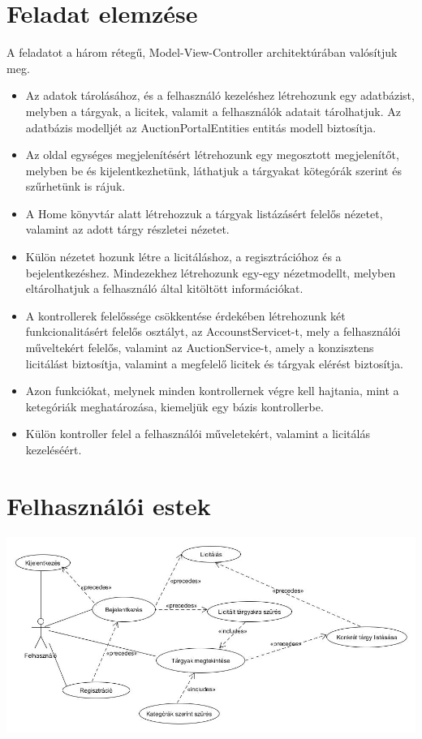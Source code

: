 \documentclass[12pt,a4paper]{article}
\begin{document}
\section{Feladat elemzése}
A feladatot a három rétegű, Model-View-Controller architektúrában valósítjuk meg.
\begin{itemize}
\item Az adatok tárolásához, és a felhasználó kezeléshez létrehozunk egy adatbázist, melyben a tárgyak, a licitek, valamit a felhasználók adatait tárolhatjuk. Az adatbázis modelljét az AuctionPortalEntities entitás modell biztosítja.
\item Az oldal egységes megjelenítésért létrehozunk egy megosztott megjelenítőt, melyben be és kijelentkezhetünk, láthatjuk a tárgyakat kötegórák szerint és szűrhetünk is rájuk.
\item A Home könyvtár alatt létrehozzuk a tárgyak listázásért felelős nézetet, valamint az adott tárgy részletei nézetet.
\item Külön nézetet hozunk létre a licitáláshoz, a regisztrációhoz és a bejelentkezéshez. Mindezekhez létrehozunk egy-egy nézetmodellt, melyben eltárolhatjuk a felhasználó által kitöltött információkat.
\item A kontrollerek felelőssége csökkentése érdekében létrehozunk két funkcionalitásért felelős osztályt, az AccounstServicet-t, mely a felhasználói műveltekért felelős, valamint az AuctionService-t, amely a konzisztens licitálást biztosítja, valamint a megfelelő licitek és tárgyak elérést biztosítja.
\item Azon funkciókat, melynek minden kontrollernek  végre kell hajtania, mint a ketegóriák meghatározása, kiemeljük egy bázis kontrollerbe.
\item Külön kontroller felel a felhasználói műveletekért, valamint a licitálás kezeléséért.
\end{itemize}

\section{Felhasználói estek}
\includegraphics[scale=0.5]{felhasznaloi_diag.jpg}
\end{document}
